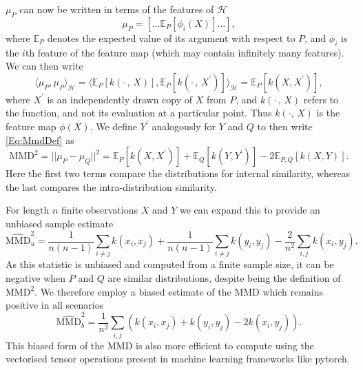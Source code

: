 $\mu_P$ can now be written in terms of the features of $\mathcal{H}$
\begin{equation}
    \mu_P = [\ldots \mathbb{E}_P[\phi_i(X)] \ldots],
\end{equation}
where $\mathbb{E}_P$ denotes the expected value of its argument with respect to $P$, and $\phi_i$ is the $i$th feature of the feature map (which may contain infinitely many features).
We can then write
\begin{equation}
    \langle \mu_P, \mu_P \rangle_\mathcal{H} = \langle \mathbb{E}_P [k(\cdot\, ,\, X)], \mathbb{E}_{P} [k(\cdot\, ,\, X^\prime)] \rangle_\mathcal{H} = \mathbb{E}_{P} [k(X, X^\prime)],
\end{equation}
where $X^\prime$ is an independently drawn copy of $X$ from $P$, and $k(\cdot\, ,\, X)$ refers to the function, and not its evaluation at a particular point.
Thus $k(\cdot,\, X)$ is the feature map $\phi(X)$.
We define $Y^\prime$ analogously for $Y$ and $Q$ to then write \eqref{Eq:MmdDef} as
\begin{equation}
    \mathrm{MMD}^2 = ||\mu_P - \mu_Q|| ^2
                   = \mathbb{E}_P [k(X, X^\prime)] + \mathbb{E}_Q [k(Y, Y^\prime)] - 2 \mathbb{E}_{P,Q}[k(X,Y)].
\end{equation}
Here the first two terms compare the distributions for internal similarity, whereas the last compares the intra-distribution similarity.

For length $n$ finite observations $X$ and $Y$ we can expand this to provide an unbiased sample estimate
\begin{equation}
    \widehat{\mathrm{MMD}}_u^2 = \frac{1}{n(n-1)} \sum_{i\neq j} k(x_i, x_j) + \frac{1}{n(n-1)} \sum_{i\neq j} k(y_i, y_j) - \frac{2}{n^2} \sum_{i, j} k(x_i, y_j).
\end{equation}
As this statistic is unbiased and computed from a finite sample size, it can be negative when $P$ and $Q$ are similar distributions, despite being the definition of $\mathrm{MMD}^2$.
We therefore employ a biased estimate of the MMD which remains positive in all scenarios
\begin{equation}
    \widehat{\mathrm{MMD}}_b^2 = \frac{1}{n^2}\sum_{i, j}\left( k(x_i, x_j) + k(y_i, y_j) - 2k(x_i, y_j) \right).
\end{equation}
This biased form of the MMD is also more efficient to compute using the vectorised tensor operations present in machine learning frameworks like pytorch.

